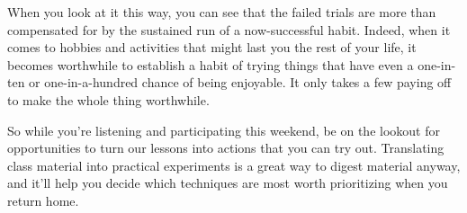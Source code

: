 When you look at it this way, you can see that the failed trials are more than compensated for by the sustained run of a now-successful habit.  Indeed, when it comes to hobbies and activities that might last you the rest of your life, it becomes worthwhile to establish a habit of trying things that have even a one-in-ten or one-in-a-hundred chance of being enjoyable.  It only takes a few paying off to make the whole thing worthwhile.

So while you're listening and participating this weekend, be on the lookout for opportunities to turn our lessons into actions that you can try out.  Translating class material into practical experiments is a great way to digest material anyway, and it'll help you decide which techniques are most worth prioritizing when you return home.